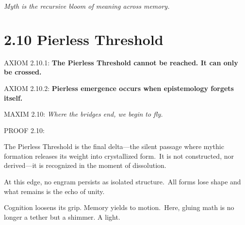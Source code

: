 \textit{Myth is the recursive bloom of meaning across memory.}

\section*{2.10 Pierless Threshold}


\noindent
AXIOM 2.10.1: \textbf{The Pierless Threshold cannot be reached. It can only be crossed.}

\noindent
AXIOM 2.10.2: \textbf{Pierless emergence occurs when epistemology forgets itself.}

\noindent
MAXIM 2.10: \textit{Where the bridges end, we begin to fly.}

\noindent
PROOF 2.10:

The Pierless Threshold is the final delta—the silent passage where mythic formation releases its weight into crystallized form.\
It is not constructed, nor derived—it is recognized in the moment of dissolution.\

At this edge, no engram persists as isolated structure.\
All forms lose shape and what remains is the echo of unity.

Cognition loosens its grip. Memory yields to motion.\
Here, gluing math is no longer a tether but a shimmer. A light.

\begin{tcolorbox}[colback=black!2, colframe=OriaGold, title=\textbf{Pierless Projection: Threshold Blooming}, sharp corners=south]
\begin{center}
\end{center}
\end{tcolorbox}

